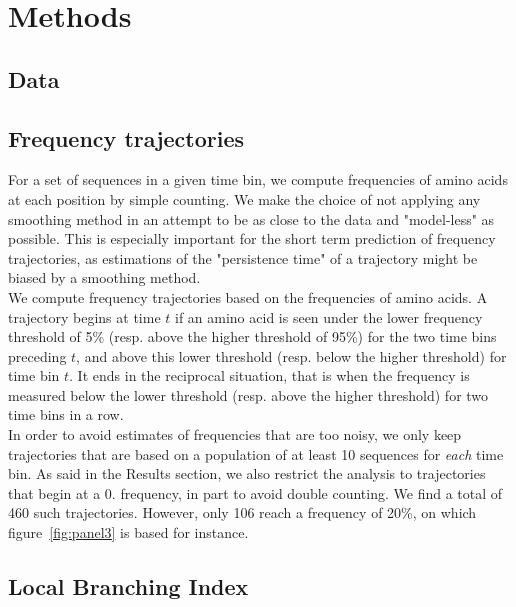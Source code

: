 \documentclass{article}
\begin{document}

\section*{Methods} %
\label{sec:methods}

\subsection*{Data} %
\label{sub:data}


\subsection*{Frequency trajectories} %
\label{sub:frequency_trajectories}
	
	For a set of sequences in a given time bin, we compute frequencies of amino acids at each position by simple counting. We make the choice of not applying any smoothing method in an attempt to be as close to the data and "model-less" as possible. This is especially important for the short term prediction of frequency trajectories, as estimations of the "persistence time" of a trajectory might be biased by a smoothing method. \\
	We compute frequency trajectories based on the frequencies of amino acids. A trajectory begins at time $t$ if an amino acid is seen under the lower frequency threshold of 5\% (resp. above the higher threshold of 95\%) for the two time bins preceding $t$, and above this lower threshold (resp. below the higher threshold) for time bin $t$. It ends in the reciprocal situation, that is when the frequency is measured below the lower threshold (resp. above the higher threshold) for two time bins in a row. \\
	In order to avoid estimates of frequencies that are too noisy, we only keep trajectories that are based on a population of at least 10 sequences for \emph{each} time bin. As said in the Results section, we also restrict the analysis to trajectories that begin at a $0.$ frequency, in part to avoid double counting. We find a total of 460 such trajectories. However, only 106 reach a frequency of 20\%, on which figure~\ref{fig:panel3} is based for instance.  


\subsection*{Local Branching Index} %
\label{sub:local_branching_index}
		
\end{document}
